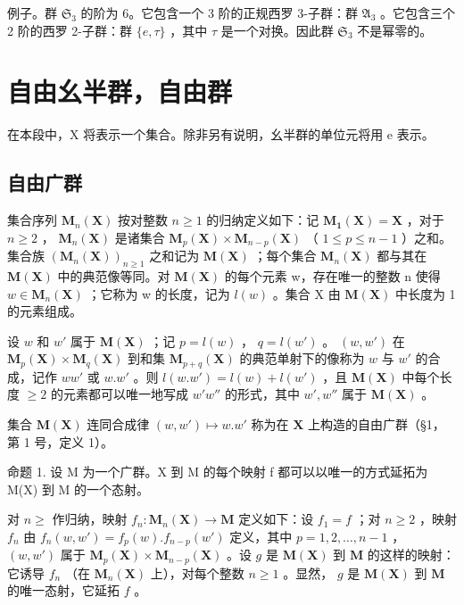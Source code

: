 例子。群 \(\mathfrak{S}_3\) 的阶为 6。它包含一个 3 阶的正规西罗 3-子群：群 \(\mathfrak{A}_3\) 。它包含三个 2 阶的西罗 2-子群：群 \(\{e, \tau\}\) ，其中 \(\tau\) 是一个对换。因此群 \(\mathfrak{S}_3\) 不是幂零的。

\section{自由幺半群，自由群}

在本段中，X 将表示一个集合。除非另有说明，幺半群的单位元将用 e 表示。

\subsection{自由广群}

集合序列 \(\mathbf{M}_{n}(\mathbf{X})\) 按对整数 \(n \geqslant 1\) 的归纳定义如下：记 \(\mathbf{M}_{\mathbf{1}}(\mathbf{X}) = \mathbf{X}\) ，对于 \(n \geqslant 2\) ， \(\mathbf{M}_{n}(\mathbf{X})\) 是诸集合 \(\mathbf{M}_{p}(\mathbf{X}) \times \mathbf{M}_{n-p}(\mathbf{X})\) （ \(1 \leqslant p \leqslant n - 1\) ）之和。集合族 \((\mathbf{M}_{n}(\mathbf{X}))_{n \geqslant 1}\) 之和记为 \(\mathbf{M}(\mathbf{X})\) ；每个集合 \(\mathbf{M}_{n}(\mathbf{X})\) 都与其在 \(\mathbf{M}(\mathbf{X})\) 中的典范像等同。对 \(\mathbf{M}(\mathbf{X})\) 的每个元素 w，存在唯一的整数 n 使得 \(w \in \mathbf{M}_{n}(\mathbf{X})\) ；它称为 w 的长度，记为 \(l(w)\) 。集合 X 由 \(\mathbf{M}(\mathbf{X})\) 中长度为 1 的元素组成。

设 \(w\) 和 \(w'\) 属于 \(\mathbf{M}(\mathbf{X})\) ；记 \(p = l(w)\) ， \(q = l(w')\) 。 \((w, w')\) 在 \(\mathbf{M}_p(\mathbf{X}) \times \mathbf{M}_q(\mathbf{X})\) 到和集 \(\mathbf{M}_{p + q}(\mathbf{X})\) 的典范单射下的像称为 \(w\) 与 \(w'\) 的合成，记作 \(ww'\) 或 \(w.w'\) 。则 \(l(w.w') = l(w) + l(w')\) ，且 \(\mathbf{M}(\mathbf{X})\) 中每个长度 \(\geqslant 2\) 的元素都可以唯一地写成 \(w'w''\) 的形式，其中 \(w', w''\) 属于 \(\mathbf{M}(\mathbf{X})\) 。

集合 \(\mathbf{M}(\mathbf{X})\) 连同合成律 \((w, w') \mapsto w.w'\) 称为在 \(\mathbf{X}\) 上构造的自由广群（§1，第 1 号，定义 1）。

命题 1. 设 M 为一个广群。X 到 M 的每个映射 f 都可以以唯一的方式延拓为 M(X) 到 M 的一个态射。

对 \(n \geqslant\) 作归纳，映射 \(f_n: \mathbf{M}_n(\mathbf{X}) \to \mathbf{M}\) 定义如下：设 \(f_{1} = f\) ；对 \(n \geqslant 2\) ，映射 \(f_{n}\) 由 \(f_{n}(w, w') = f_{p}(w).f_{n-p}(w')\) 定义，其中 \(p = 1, 2, \ldots, n - 1\) ， \((w, w')\) 属于 \(\mathbf{M}_{p}(\mathbf{X}) \times \mathbf{M}_{n-p}(\mathbf{X})\) 。设 \(g\) 是 \(\mathbf{M}(\mathbf{X})\) 到 \(\mathbf{M}\) 的这样的映射：它诱导 \(f_{n}\) （在 \(\mathbf{M}_{n}(\mathbf{X})\) 上），对每个整数 \(n \geqslant 1\) 。显然， \(g\) 是 \(\mathbf{M}(\mathbf{X})\) 到 \(\mathbf{M}\) 的唯一态射，它延拓 \(f\) 。

